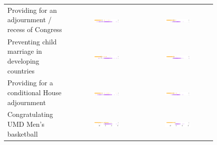 \begin{figure}
\begin{tabular}{|p{4.3cm}|c|c|}
Providing for an adjournment / recess of Congress
& \includegraphics[width=0.4\textwidth]{chapter_spatial_voting_with_text/figures/3397_ideal_point_4.pdf}
& \includegraphics[width=0.4\textwidth]{chapter_spatial_voting_with_text/figures/3397_adjusted_ideal_point_4.pdf} \\

Preventing child marriage in developing countries
& \includegraphics[width=0.4\textwidth]{chapter_spatial_voting_with_text/figures/3397_ideal_point_3.pdf}
& \includegraphics[width=0.4\textwidth]{chapter_spatial_voting_with_text/figures/3397_adjusted_ideal_point_3.pdf} \\

Providing for a conditional House adjournment
& \includegraphics[width=0.4\textwidth]{chapter_spatial_voting_with_text/figures/3397_ideal_point_2.pdf}
& \includegraphics[width=0.4\textwidth]{chapter_spatial_voting_with_text/figures/3397_adjusted_ideal_point_2.pdf} \\

Congratulating UMD Men's basketball
& \includegraphics[width=0.4\textwidth]{chapter_spatial_voting_with_text/figures/3397_ideal_point_1.pdf}
& \includegraphics[width=0.4\textwidth]{chapter_spatial_voting_with_text/figures/3397_adjusted_ideal_point_1.pdf} \\
\hline
  \end{tabular}
\end{figure}

